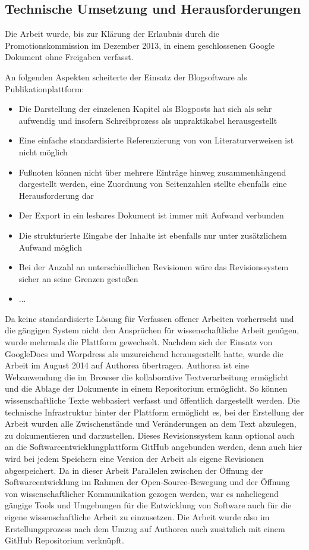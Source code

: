 \subsection{Technische Umsetzung und Herausforderungen}

Die Arbeit wurde, bis zur Klärung der Erlaubnis durch die Promotionskommission im Dezember 2013, in einem geschlossenen Google Dokument ohne Freigaben verfasst.

An folgenden Aspekten scheiterte der Einsatz der Blogsoftware als Publikationplattform:
\begin{itemize}
\item Die Darstellung der einzelenen Kapitel als Blogposts hat sich als sehr aufwendig und insofern Schreibprozess als unpraktikabel herausgestellt
\item Eine einfache standardisierte Referenzierung von von Literaturverweisen ist nicht möglich
\item Fußnoten können nicht über mehrere Einträge hinweg zusammenhängend dargestellt werden, eine Zuordnung von Seitenzahlen stellte ebenfalls eine Herausforderung dar
\item Der Export in ein lesbares Dokument ist immer mit Aufwand verbunden
\item Die strukturierte Eingabe der Inhalte ist ebenfalls nur unter zusätzlichem Aufwand möglich
\item Bei der Anzahl an unterschiedlichen Revisionen wäre das Revisionssystem sicher an seine Grenzen gestoßen
\item ...
\end{itemize}

Da keine standardisierte Lösung für Verfassen offener Arbeiten vorherrscht und die gängigen System nicht den Ansprüchen für wissenschaftliche Arbeit genügen, wurde mehrmals die Plattform gewechselt. Nachdem sich der Einsatz von GoogleDocs und Worpdress als unzureichend herausgestellt hatte, wurde die Arbeit im August 2014 auf Authorea übertragen. Authorea ist eine Webanwendung die im Browser die kollaborative Textverarbeitung ermöglicht und die Ablage der Dokumente in einem Repositorium ermöglicht. So können wissenschaftliche Texte webbasiert verfasst und öffentlich dargestellt werden. Die technische Infrastruktur hinter der Plattform ermöglicht es, bei der Erstellung der Arbeit wurden alle Zwischenstände und Veränderungen an dem Text abzulegen, zu dokumentieren und darzustellen. Dieses Revisionssystem kann optional auch an die Softwareentwicklungplattform GitHub angebunden werden, denn auch hier wird bei jedem Speichern eine Version der Arbeit als eigene Revisionen abgespeichert. Da in dieser Arbeit Parallelen zwischen der Öffnung der Softwareentwicklung im Rahmen der Open-Source-Bewegung und der Öffnung von wissenschaftlicher Kommunikation gezogen werden, war es naheliegend gängige Tools und Umgebungen für die Entwicklung von Software auch für die eigene wissenschaftliche Arbeit zu einzusetzen. Die Arbeit wurde also im Erstellungsprozess nach dem Umzug auf Authorea auch zusätzlich mit einem GitHub Repositorium verknüpft.

